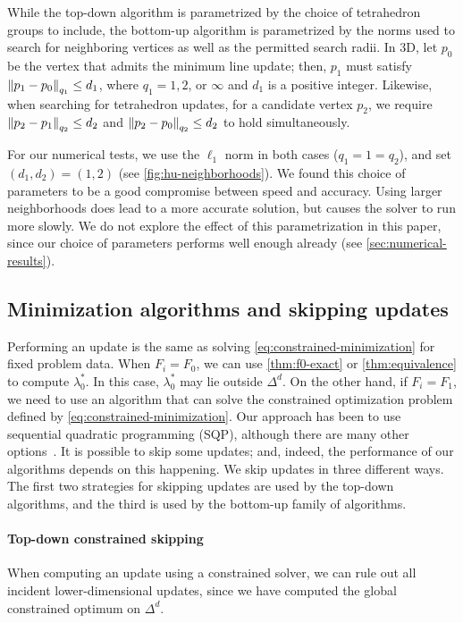 \documentclass{article}
\begin{document}
While the top-down algorithm is parametrized by the choice of
tetrahedron groups to include, the bottom-up algorithm is parametrized
by the norms used to search for neighboring vertices as well as the
permitted search radii. In 3D, let $p_0$ be the vertex that admits the
minimum line update; then, $p_1$ must satisfy
$\left\|p_1 - p_0\right\|_{q_1} \leq d_1$, where $q_1 = 1, 2$, or $\infty$ and
$d_1$ is a positive integer. Likewise, when searching for tetrahedron
updates, for a candidate vertex $p_2$, we require
$\left\|p_2 - p_1\right\|_{q_2} \leq d_2$ and
$\left\|p_2 - p_0\right\|_{q_2} \leq d_2$ to hold simultaneously.

For our numerical tests, we use the $\ell_1$ norm in both cases
($q_1 = 1 = q_2$), and set $(d_1, d_2) = (1, 2)$ (see
\cref{fig:hu-neighborhoods}). We found this choice of parameters to be
a good compromise between speed and accuracy. Using larger
neighborhoods does lead to a more accurate solution, but causes the
solver to run more slowly. We do not explore the effect of this
parametrization in this paper, since our choice of parameters performs
well enough already (see \cref{sec:numerical-results}).
\subsection{Minimization algorithms and skipping
  updates}\label{ssec:algorithms-and-skipping}

Performing an update is the same as solving
\cref{eq:constrained-minimization} for fixed problem data. When
$F_i = F_0$, we can use \cref{thm:f0-exact} or \cref{thm:equivalence}
to compute $\lambda_0^*$. In this case, $\lambda_0^*$ may lie outside
$\Delta^d$. On the other hand, if $F_i = F_1$, we need to use an
algorithm that can solve the constrained optimization problem defined
by \cref{eq:constrained-minimization}. Our approach has been to use
sequential quadratic programming (SQP), although there are many other
options~\cite{bertsekas1999nonlinear,nocedal2006numerical}. It is
possible to skip some updates; and, indeed, the performance of our
algorithms depends on this happening. We skip updates in three
different ways. The first two strategies for skipping updates are used
by the top-down algorithms, and the third is used by the bottom-up
family of algorithms.

\paragraph{Top-down constrained skipping} When computing an update
using a constrained solver, we can rule out all incident
lower-dimensional updates, since we have computed the global
constrained optimum on $\Delta^d$.
\end{document}
